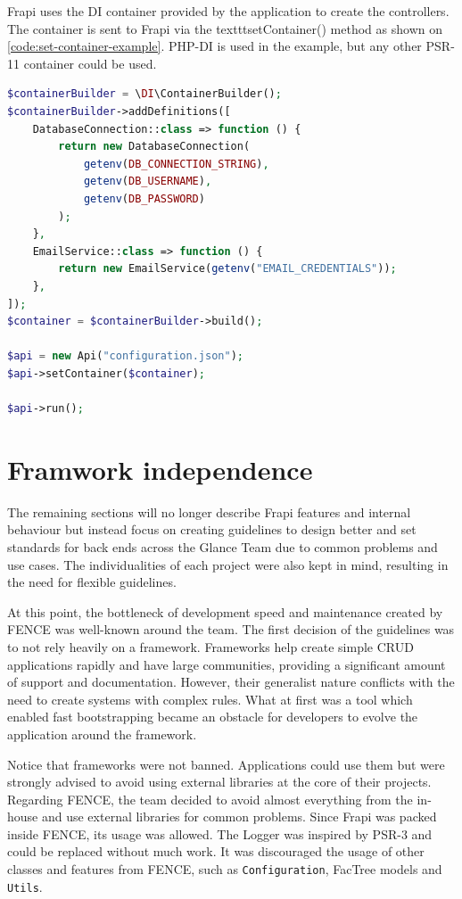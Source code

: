 Frapi uses the DI container provided by the application to create the controllers. The container is sent to Frapi via the texttt{setContainer()} method as shown on \autoref{code:set-container-example}. PHP-DI \cite{php-di} is used in the example, but any other PSR-11 container could be used.

\begin{lstlisting}[language=PHP,label={code:set-container-example},caption={Dependency injection definitions and usage example of the \texttt{setContainer} method.}]
$containerBuilder = \DI\ContainerBuilder();
$containerBuilder->addDefinitions([
	DatabaseConnection::class => function () {
		return new DatabaseConnection(
			getenv(DB_CONNECTION_STRING),
			getenv(DB_USERNAME),
			getenv(DB_PASSWORD)
		);
	},
	EmailService::class => function () {
		return new EmailService(getenv("EMAIL_CREDENTIALS"));
	},
]);
$container = $containerBuilder->build();

$api = new Api("configuration.json");
$api->setContainer($container);

$api->run();
\end{lstlisting}

\section{Framwork independence}

The remaining sections will no longer describe Frapi features and internal behaviour but instead focus on creating guidelines to design better and set standards for back ends across the Glance Team due to common problems and use cases. The individualities of each project were also kept in mind, resulting in the need for flexible guidelines.

At this point, the bottleneck of development speed and maintenance created by FENCE was well-known around the team. The first decision of the guidelines was to not rely heavily on a framework. Frameworks help create simple CRUD applications rapidly and have large communities, providing a significant amount of support and documentation. However, their generalist nature conflicts with the need to create systems with complex rules. What at first was a tool which enabled fast bootstrapping became an obstacle for developers to evolve the application around the framework.

Notice that frameworks were not banned. Applications could use them but were strongly advised to avoid using external libraries at the core of their projects. Regarding FENCE, the team decided to avoid almost everything from the in-house and use external libraries for common problems. Since Frapi was packed inside FENCE, its usage was allowed. The Logger was inspired by PSR-3 \cite{psr-3} and could be replaced without much work. It was discouraged the usage of other classes and features from FENCE, such as \texttt{Configuration}, FacTree models and \texttt{Utils}.

